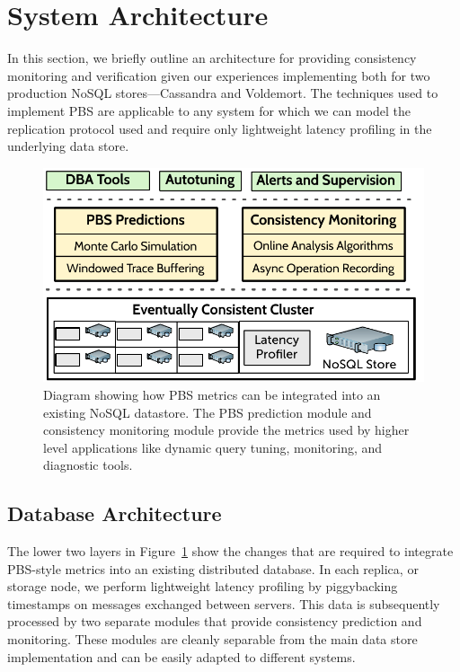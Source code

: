 \section{System Architecture}
\label{sec:architecture}

In this section, we briefly outline an architecture for providing
consistency monitoring and verification given our experiences
implementing both for two production NoSQL stores---Cassandra and
Voldemort. The techniques used to implement PBS are applicable to any
system for which we can model the replication protocol used and
require only lightweight latency profiling in the underlying data
store.


\begin{figure}
\centering
\includegraphics[width=\columnwidth]{figs/cluster-arch.pdf}
\caption{Diagram showing how PBS metrics can be integrated into an
  existing NoSQL datastore. The PBS prediction module and consistency
  monitoring module provide the metrics used by higher level applications like
  dynamic query tuning, monitoring, and diagnostic tools.}
\label{fig:pbs-sys-arch}
\end{figure}


\subsection{Database Architecture}
\label{sec:dbarch}

The lower two layers in Figure~\ref{fig:pbs-sys-arch} show the changes
that are required to integrate PBS-style metrics into an existing
distributed database. In each replica, or storage node, we perform
lightweight latency profiling by piggybacking timestamps on messages
exchanged between servers. This data is subsequently processed by two
separate modules that provide consistency prediction and monitoring.
These modules are cleanly separable from the main data
store implementation and can be easily adapted to different systems.\\

